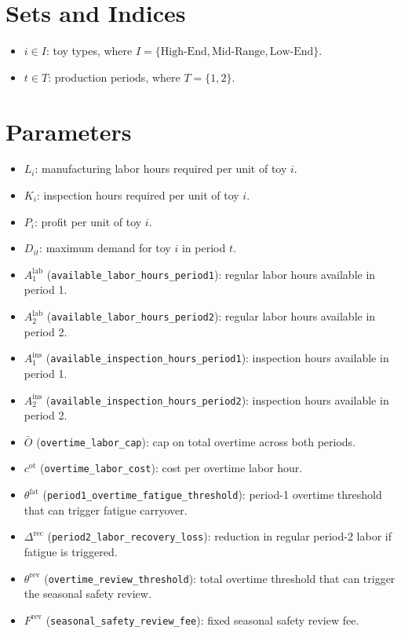\section*{Sets and Indices}

\begin{itemize}
    \item $i \in I$: toy types, where $I=\{\text{High-End},\text{Mid-Range},\text{Low-End}\}$.
    \item $t \in T$: production periods, where $T=\{1,2\}$.
\end{itemize}

\section*{Parameters}

\begin{itemize}
    \item $L_i$: manufacturing labor hours required per unit of toy $i$.
    \item $K_i$: inspection hours required per unit of toy $i$.
    \item $P_i$: profit per unit of toy $i$.
    \item $D_{it}$: maximum demand for toy $i$ in period $t$.
    \item $A^{\text{lab}}_1$ (\texttt{available\_labor\_hours\_period1}): regular labor hours available in period 1.
    \item $A^{\text{lab}}_2$ (\texttt{available\_labor\_hours\_period2}): regular labor hours available in period 2.
    \item $A^{\text{ins}}_1$ (\texttt{available\_inspection\_hours\_period1}): inspection hours available in period 1.
    \item $A^{\text{ins}}_2$ (\texttt{available\_inspection\_hours\_period2}): inspection hours available in period 2.
    \item $\bar O$ (\texttt{overtime\_labor\_cap}): cap on total overtime across both periods.
    \item $c^{\text{ot}}$ (\texttt{overtime\_labor\_cost}): cost per overtime labor hour.
    \item $\theta^{\text{fat}}$ (\texttt{period1\_overtime\_fatigue\_threshold}): period-1 overtime threshold that can trigger fatigue carryover.
    \item $\Delta^{\text{rec}}$ (\texttt{period2\_labor\_recovery\_loss}): reduction in regular period-2 labor if fatigue is triggered.
    \item $\theta^{\text{rev}}$ (\texttt{overtime\_review\_threshold}): total overtime threshold that can trigger the seasonal safety review.
    \item $F^{\text{rev}}$ (\texttt{seasonal\_safety\_review\_fee}): fixed seasonal safety review fee.
\end{itemize}

